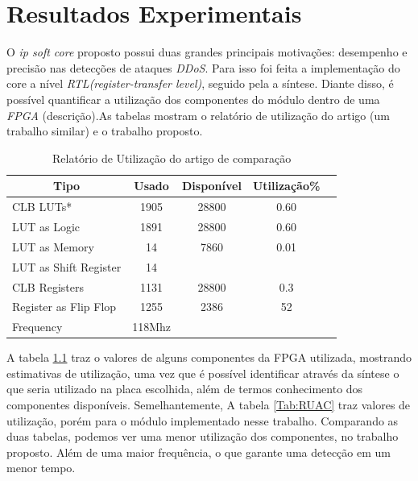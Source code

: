 \chapter{Resultados Experimentais}\label{CAP4}

O \textit{ip soft core} proposto possui duas grandes principais motivações: desempenho e precisão nas detecções de ataques \textit{DDoS}. Para isso foi feita a implementação do core a nível \textit{RTL(register-transfer level)}, seguido pela a síntese. Diante disso, é possível quantificar a utilização dos componentes do módulo dentro de uma \textit{FPGA} (descrição).As tabelas  mostram o relatório de utilização do artigo \cite{HOQUE201748} (um trabalho similar) e o trabalho proposto. 
\begin{table}[!htb]
	\centering
	\caption{Relatório de Utilização do artigo de comparação}
	\label{Tab:RUP}
	\begin{tabular}{lcccc}
		\hline
		\multicolumn{1}{c}{Tipo}&\multicolumn{1}{c}{Usado }&\multicolumn{1}{c}{Disponível}&\multicolumn{1}{c}{Utilização\%} \\ \midrule 
		
		CLB LUTs*&  1905  & 28800 & 0.60  \\   \midrule
		LUT as Logic & 1891  & 28800 &  0.60  \\  \midrule
		LUT as Memory &  14  & 7860 &  0.01  \\  \midrule
		LUT as Shift Register & 14  &  &   \\  \midrule
		CLB Registers  & 1131  & 28800 & 0.3  \\  \midrule
		Register as Flip Flop & 1255  & 2386  & 52    \\  \midrule
		Frequency &  118Mhz 
	\end{tabular}
\end{table}

A tabela \ref{Tab:RUP} traz o valores de alguns componentes da FPGA utilizada, mostrando estimativas de utilização, uma vez que é possível identificar através da síntese o que seria utilizado na placa escolhida, além de termos conhecimento  dos componentes disponíveis. Semelhantemente, A tabela \ref{Tab:RUAC} traz valores de utilização, porém para o módulo implementado nesse trabalho. Comparando as duas tabelas, podemos ver uma menor utilização dos componentes, no trabalho proposto. Além de uma maior frequência, o que garante uma detecção em um menor tempo.


